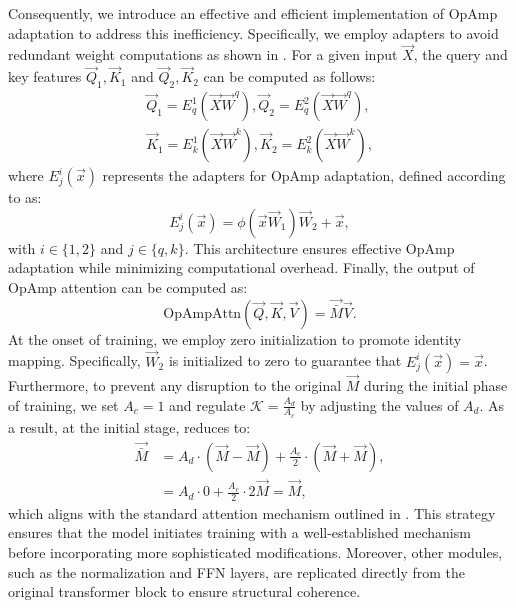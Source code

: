 Consequently, we introduce an effective and efficient implementation of OpAmp adaptation to address this inefficiency.
Specifically, we employ adapters to avoid redundant weight computations as shown in .
For a given input $\vec{X}$, the query and key features $\vec{Q}_1, \vec{K}_1$ and $\vec{Q}_2, \vec{K}_2$ can be computed as follows:
\begin{align}
    \vec{Q}_1 = E^1_q(\vec{X}\vec{W}^q), \vec{Q}_2 = E^2_q(\vec{X}\vec{W}^q), \\
    \vec{K}_1 = E^1_k(\vec{X}\vec{W}^k), \vec{K}_2 = E^2_k(\vec{X}\vec{W}^k),
\end{align}
where $E^{i}_{j}(\vec{x})$ represents the adapters for OpAmp adaptation, defined according to  as:
\begin{equation}
    E^{i}_{j}(\vec{x}) = \phi(\vec{x}\vec{W}_1)\vec{W}_2 + \vec{x},
\label{eq:opampadapter}
\end{equation}
with $i \in \{1, 2\}$ and $j \in \{q, k\}$.
This architecture ensures effective OpAmp adaptation while minimizing computational overhead.
Finally, the output of OpAmp attention can be computed as:
\begin{equation}
    \mathrm{OpAmpAttn}(\vec{Q}, \vec{K}, \vec{V}) = \vec{\bar{M}}\vec{V}.
\end{equation}
At the onset of training, we employ zero initialization to promote identity mapping. 
Specifically, $\vec{W}_2$ is initialized to zero to guarantee that $E^{i}_{j}(\vec{x}) = \vec{x}$. 
Furthermore, to prevent any disruption to the original $\vec{M}$ during the initial phase of training, we set $A_c = 1$ and regulate $\mathcal{K} = \frac{A_d}{A_c}$ by adjusting the values of $A_d$. 
As a result, at the initial stage,  reduces to:
\begin{align}
    \vec{\bar{M}} &= A_{d} \cdot (\vec{M} - \vec{M}) + \frac{A_{c}}{2} \cdot (\vec{M} + \vec{M}), \nonumber \\
    &= A_{d} \cdot 0 + \frac{A_{c}}{2} \cdot 2 \vec{M} = \vec{M},
\end{align}
which aligns with the standard attention mechanism outlined in . 
This strategy ensures that the model initiates training with a well-established mechanism before incorporating more sophisticated modifications.
Moreover, other modules, such as the normalization and FFN layers, are replicated directly from the original transformer block to ensure structural coherence.